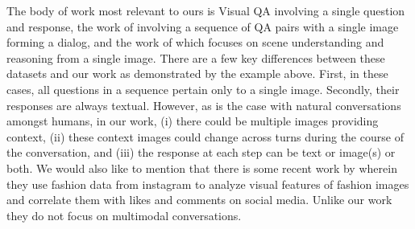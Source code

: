 \documentclass[letterpaper]{article} %
\begin{document}
The body of work most relevant to ours is Visual QA\cite{vqa-visual-question-answering} involving a single question and response, the work of \cite{DBLP:journals/corr/MostafazadehBDG17,DBLP:journals/corr/DasKGSYMPB16} involving a sequence of QA pairs with a single image forming a dialog, and the work of \cite{DBLP:journals/corr/VriesSCPLC16} which focuses on scene understanding and reasoning from a single image. There are a few key differences between these datasets and our work as demonstrated by the example above. First, in these cases, all questions in a sequence pertain only to a single image. Secondly, their responses are always textual. However, as is the case with natural conversations amongst humans, in our work, (i) there could be multiple images providing context, (ii) these context images could change across turns during the course of the conversation, and (iii) the response at each step can be text or image(s) or both. We would also like to mention that there is some recent work by \cite{DBLP:journals/corr/yuiha} wherein they use fashion data from instagram to analyze visual features of fashion images and correlate them with likes and comments on social media. Unlike our work they do not focus on multimodal conversations.

\end{document}
